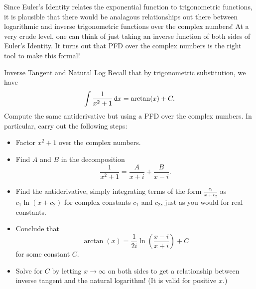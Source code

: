 Since Euler's Identity relates the exponential function to trigonometric functions, it is plausible that there would be analagous relationships out there between logarithmic and inverse trigonometric functions over the complex numbers!  At a very crude level, one can think of just taking an inverse function of both sides of Euler's Identity.  It turns out that PFD over the complex numbers is the right tool to make this formal!

\begin{exercise}{Inverse Tangent and Natural Log}
Recall that by trigonometric substitution, we have $$\int \frac{1}{x^2+1}\mathop{}\!\mathtt{d} x=\arctan(x)+C. $$  Compute the same antiderivative but using a PFD over the complex numbers.  In particular, carry out the following steps:
\begin{itemize}
\item Factor $x^2+1$ over the complex numbers.
\vspace*{.5in}
\item Find $A$ and $B$ in the decomposition $$\frac{1}{x^2+1}=\frac{A}{x+i}+\frac{B}{x-i}. $$
\vspace*{1in}
\item Find the antiderivative, simply integrating terms of the form $\frac{c_1}{x+c_2}$ as $c_1\ln\left(x+c_2\right)$ for complex constants $c_1$ and $c_2$, just as you would for real constants.
\vspace*{1in}
\item Conclude that $$\arctan(x) = \frac{1}{2i} \ln\left(\frac{x-i}{x+i}\right) + C$$ for some constant $C$.
\vspace*{1in}
\item Solve for $C$ by letting $x\to \infty$ on both sides to get a relationship between inverse tangent and the natural logarithm! (It is valid for positive $x$.)
\vspace*{1in}

\end{itemize}

\end{exercise}
